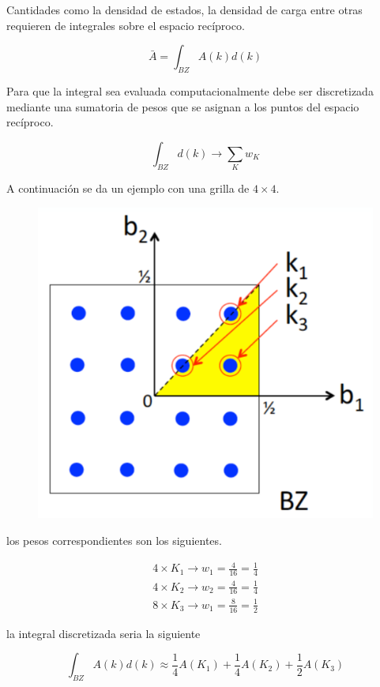 Cantidades como la densidad de estados, la densidad de carga entre otras requieren de integrales sobre el espacio rec\'iproco.

\begin{equation}
    \bar{A} = \int _{BZ} A(k) d(k)
\end{equation}

\noindent Para que la integral sea evaluada computacionalmente debe ser discretizada mediante una sumatoria de pesos que se asignan a los puntos del espacio rec\'iproco.

\begin{equation}
    \int _{BZ} d(k) \to \sum _{K} w_{K}
\end{equation}

\noindent A continuaci\'on se da un ejemplo con una grilla de $4 \times 4$.

\begin{figure}[H]
    \centering
    \includegraphics[width=0.6\linewidth]{contenido/calculos_computacionales/integrales_reciproco/img_reciproco/ZonaBrillouin}
\end{figure}

\noindent los pesos correspondientes son los siguientes.

\begin{eqnarray}
4 \times K_{1} \to w_{1} = \frac{4}{16} = \frac{1}{4} \nonumber \\
4 \times K_{2} \to w_{2} = \frac{4}{16} = \frac{1}{4}  \\
8 \times K_{3} \to w_{1} = \frac{8}{16} = \frac{1}{2} \nonumber
\end{eqnarray}

\noindent la integral discretizada seria la siguiente

\begin{equation}
    \int _{BZ} A(k) d(k) \approx \frac{1}{4}A(K_{1}) + \frac{1}{4}A(K_{2}) + \frac{1}{2}A(K_{3})
\end{equation}
